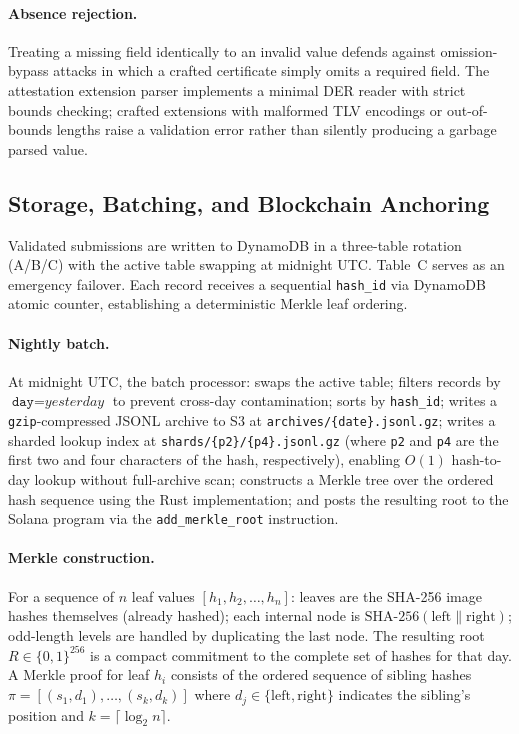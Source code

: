 \documentclass[11pt,a4paper]{article}
\newcommand{\SHA}{\text{SHA-256}}
\begin{document}
\paragraph{Absence rejection.} Treating a missing field identically to an
invalid value defends against omission-bypass attacks in which a crafted
certificate simply omits a required field.  The attestation extension parser
implements a minimal DER reader with strict bounds checking; crafted extensions
with malformed TLV encodings or out-of-bounds lengths raise a validation error
rather than silently producing a garbage parsed value.

\subsection{Storage, Batching, and Blockchain Anchoring}
\label{sec:storage}

Validated submissions are written to DynamoDB in a three-table rotation (A/B/C)
with the active table swapping at midnight UTC\@.  Table~C serves as an emergency
failover.  Each record receives a sequential \texttt{hash\_id} via DynamoDB
atomic counter, establishing a deterministic Merkle leaf ordering.

\paragraph{Nightly batch.} At midnight UTC, the batch processor: swaps the
active table; filters records by $\texttt{day} = \textit{yesterday}$ to prevent
cross-day contamination; sorts by \texttt{hash\_id}; writes a
\texttt{gzip}-compressed JSONL archive to S3 at
\texttt{archives/\{date\}.jsonl.gz}; writes a sharded lookup index at
\texttt{shards/\{p2\}/\{p4\}.jsonl.gz} (where \texttt{p2} and \texttt{p4} are
the first two and four characters of the hash, respectively), enabling $O(1)$
hash-to-day lookup without full-archive scan; constructs a Merkle tree over the
ordered hash sequence using the Rust implementation; and posts the resulting root
to the Solana program via the \texttt{add\_merkle\_root} instruction.

\paragraph{Merkle construction.} For a sequence of $n$ leaf values
$[h_1, h_2, \ldots, h_n]$: leaves are the SHA-256 image hashes themselves
(already hashed); each internal node is $\SHA(\mathrm{left} \mathbin\|
\mathrm{right})$; odd-length levels are handled by duplicating the last node.
The resulting root $R \in \{0,1\}^{256}$ is a compact commitment to the
complete set of hashes for that day.  A Merkle proof for leaf $h_i$ consists
of the ordered sequence of sibling hashes $\pi = [(s_1, d_1), \ldots, (s_k,
d_k)]$ where $d_j \in \{\mathrm{left}, \mathrm{right}\}$ indicates the
sibling's position and $k = \lceil \log_2 n \rceil$.
\end{document}
